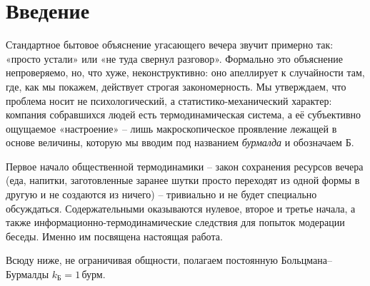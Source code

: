 \documentclass[11pt,a4paper]{article}
\newcommand{\Burm}{\text{Б}}
\newcommand{\kB}{k_{\text{Б}}}
\begin{document}
\begin{abstract}
\noindent Здесь мы впервые показываем, что упадок вечера -- не психологическая, а строгая термодинамическая закономерность, вытекающая из статистической механики замкнутой компании. Бытовое объяснение («все устали», «не туда свернул разговор») систематически игнорирует базовый факт: число доступных компании микросостояний реплик $\Omega$ по определению не убывает со временем, если компания замкнута. В настоящей работе мы вводим бурмалду $\Burm$ как экстенсивную величину состояния компании по образцу энтропии Больцмана, формулируем и доказываем второе начало общественной термодинамики (монотонный рост $\Burm$), нулевое начало (транзитивность бурмалдического равновесия) и третье начало (недостижимость абсолютного нуля неловкости), вводим демона Бурмалды и оцениваем предельный КПД превращения ресурсов вечера в веселье. Обсуждаются ограничения метода.

\medskip
\noindent\textbf{Ключевые слова:} статистическая механика компаний, второе начало общественной термодинамики, бурмалдическое равновесие, демон Бурмалды, энтропия веселья, лженаука
\end{abstract}

\section{Введение}

Стандартное бытовое объяснение угасающего вечера звучит примерно так: «просто устали» или «не туда свернул разговор». Формально это объяснение непроверяемо, но, что хуже, неконструктивно: оно апеллирует к случайности там, где, как мы покажем, действует строгая закономерность. Мы утверждаем, что проблема носит не психологический, а статистико-механический характер: компания собравшихся людей есть термодинамическая система, а её субъективно ощущаемое «настроение» -- лишь макроскопическое проявление лежащей в основе величины, которую мы вводим под названием \emph{бурмалда} и обозначаем $\Burm$.

Первое начало общественной термодинамики -- закон сохранения ресурсов вечера (еда, напитки, заготовленные заранее шутки просто переходят из одной формы в другую и не создаются из ничего) -- тривиально и не будет специально обсуждаться. Содержательными оказываются нулевое, второе и третье начала, а также информационно-термодинамические следствия для попыток модерации беседы. Именно им посвящена настоящая работа.

Всюду ниже, не ограничивая общности, полагаем постоянную Больцмана--Бурмалды $\kB=1\,\text{бурм}$.
\end{document}
